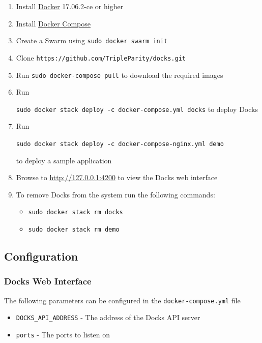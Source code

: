 \documentclass[]{article}
\providecommand{\tightlist}{%
	\setlength{\itemsep}{0pt}\setlength{\parskip}{0pt}}
\let\oldtexttt\texttt
\renewcommand{\texttt}[1]{
	\colorbox{Light}{\oldtexttt{#1}}
}
\begin{document}
\begin{enumerate}
	\def\labelenumi{\arabic{enumi}.}
	\tightlist
	\item
	  Install \href{https://docs.docker.com/install/}{Docker} 17.06.2-ce or higher
	\item
	  Install \href{https://docs.docker.com/compose/install/}{Docker Compose}
	\item
	  Create a Swarm using \texttt{sudo\ docker\ swarm\ init}
	\item
	  Clone \texttt{https://github.com/TripleParity/docks.git}
	\item
	  Run \texttt{sudo\ docker-compose\ pull} to download the required
	  images
	\item
	  Run
	  \texttt{sudo\ docker\ stack\ deploy\ -c\ docker-compose.yml\ docks} to
	  deploy Docks
	\item
	  Run
	  \texttt{sudo\ docker\ stack\ deploy\ -c\ docker-compose-nginx.yml\ demo}
	  to deploy a sample application
	\item
	  Browse to \url{http://127.0.0.1:4200} to view the Docks web interface
	\item
	  To remove Docks from the system run the following commands:
	
	  \begin{itemize}
	  \tightlist
	  \item
		\texttt{sudo\ docker\ stack\ rm\ docks}
	  \item
		\texttt{sudo\ docker\ stack\ rm\ demo}
	  \end{itemize}
	\end{enumerate}

\subsection{Configuration}

\subsubsection{Docks Web Interface}
The following parameters can be configured in the \texttt{docker-compose.yml} file

\begin{itemize}
	\tightlist
	\item \texttt{DOCKS\_API\_ADDRESS} - The address of the Docks API server
	\item \texttt{ports} - The ports to listen on
\end{itemize}
\end{document}
